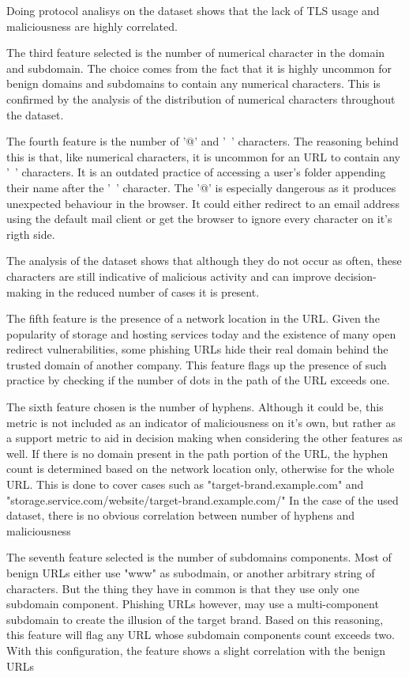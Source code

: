 Doing protocol analisys on the dataset shows that the lack of TLS usage and maliciousness are highly correlated.

The third feature selected is the number of numerical character in the domain and subdomain. The choice comes from the fact that it is highly uncommon for benign domains and subdomains to contain any numerical characters. This is confirmed by the analysis of the distribution of numerical characters throughout the dataset.

The fourth feature is the number of '@' and '~' characters. The reasoning behind this is that, like numerical characters, it is uncommon for an URL to contain any '~' characters. It is an outdated practice of accessing a user's folder appending their name after the '~' character.
The '@' is especially dangerous as it produces unexpected behaviour in the browser. It could either redirect to an email address using the default mail client or get the browser to ignore every character on it's rigth side.

The analysis of the dataset shows that although they do not occur as often, these characters are still indicative of malicious activity and can improve decision-making in the reduced number of cases it is present.


The fifth feature is the presence of a network location in the URL. Given the popularity of storage and hosting services today and the existence of many open redirect vulnerabilities, some phishing URLs hide their real domain behind the trusted domain of another company. This feature flags up the presence of such practice by checking if the number of dots in the path of the URL exceeds one.

The sixth feature chosen is the number of hyphens. Although it could be, this metric is not included as an indicator of maliciousness on it's own, but rather as a support metric to aid in decision making when considering the other features as well. If there is no domain present in the path portion of the URL, the hyphen count is determined based on the network location only, otherwise for the whole URL. This is done to cover cases such as "target-brand.example.com" and "storage.service.com/website/target-brand.example.com/"
In the case of the used dataset, there is no obvious correlation between number of hyphens and maliciousness

The seventh feature selected is the number of subdomains components. Most of benign URLs either use "www" as subodmain, or another arbitrary string of characters. But the thing they have in common is that they use only one subdomain component. Phishing URLs however, may use a multi-component subdomain to create the illusion of the target brand. Based on this reasoning, this feature will flag any URL whose subdomain components count exceeds two. With this configuration, the feature shows a slight correlation with the benign URLs

